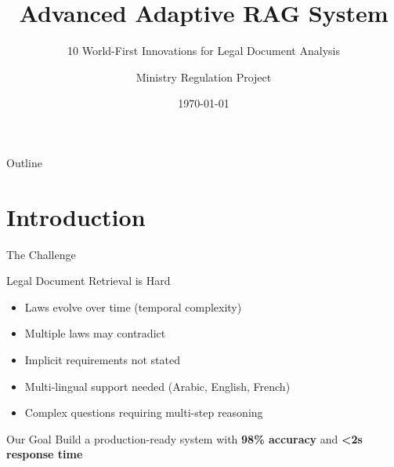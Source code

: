 \documentclass{beamer}
\title{Advanced Adaptive RAG System}
\subtitle{10 World-First Innovations for Legal Document Analysis}
\author{Ministry Regulation Project}
\institute{GitHub: Samir-Guenchi/Ministry-Regulation}
\date{\today}
\begin{document}
\frame{\titlepage}

\begin{frame}{Outline}
\tableofcontents
\end{frame}

\section{Introduction}

\begin{frame}{The Challenge}
\begin{block}{Legal Document Retrieval is Hard}
\begin{itemize}
    \item Laws evolve over time (temporal complexity)
    \item Multiple laws may contradict
    \item Implicit requirements not stated
    \item Multi-lingual support needed (Arabic, English, French)
    \item Complex questions requiring multi-step reasoning
\end{itemize}
\end{block}

\begin{alertblock}{Our Goal}
Build a production-ready system with \textbf{98\% accuracy} and \textbf{<2s response time}
\end{alertblock}
\end{frame}
\end{document}
